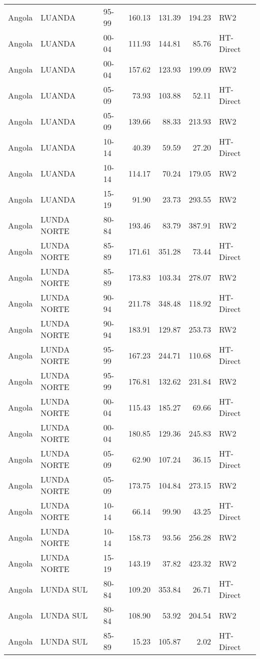 \begin{longtable}{lllrrrl}
  Angola & LUANDA & 95-99 & 160.13 & 131.39 & 194.23 & RW2 \\ 
  Angola & LUANDA & 00-04 & 111.93 & 144.81 & 85.76 & HT-Direct \\ 
  Angola & LUANDA & 00-04 & 157.62 & 123.93 & 199.09 & RW2 \\ 
  Angola & LUANDA & 05-09 & 73.93 & 103.88 & 52.11 & HT-Direct \\ 
  Angola & LUANDA & 05-09 & 139.66 & 88.33 & 213.93 & RW2 \\ 
  Angola & LUANDA & 10-14 & 40.39 & 59.59 & 27.20 & HT-Direct \\ 
  Angola & LUANDA & 10-14 & 114.17 & 70.24 & 179.05 & RW2 \\ 
  Angola & LUANDA & 15-19 & 91.90 & 23.73 & 293.55 & RW2 \\ 
  Angola & LUNDA NORTE & 80-84 & 193.46 & 83.79 & 387.91 & RW2 \\ 
  Angola & LUNDA NORTE & 85-89 & 171.61 & 351.28 & 73.44 & HT-Direct \\ 
  Angola & LUNDA NORTE & 85-89 & 173.83 & 103.34 & 278.07 & RW2 \\ 
  Angola & LUNDA NORTE & 90-94 & 211.78 & 348.48 & 118.92 & HT-Direct \\ 
  Angola & LUNDA NORTE & 90-94 & 183.91 & 129.87 & 253.73 & RW2 \\ 
  Angola & LUNDA NORTE & 95-99 & 167.23 & 244.71 & 110.68 & HT-Direct \\ 
  Angola & LUNDA NORTE & 95-99 & 176.81 & 132.62 & 231.84 & RW2 \\ 
  Angola & LUNDA NORTE & 00-04 & 115.43 & 185.27 & 69.66 & HT-Direct \\ 
  Angola & LUNDA NORTE & 00-04 & 180.85 & 129.36 & 245.83 & RW2 \\ 
  Angola & LUNDA NORTE & 05-09 & 62.90 & 107.24 & 36.15 & HT-Direct \\ 
  Angola & LUNDA NORTE & 05-09 & 173.75 & 104.84 & 273.15 & RW2 \\ 
  Angola & LUNDA NORTE & 10-14 & 66.14 & 99.90 & 43.25 & HT-Direct \\ 
  Angola & LUNDA NORTE & 10-14 & 158.73 & 93.56 & 256.28 & RW2 \\ 
  Angola & LUNDA NORTE & 15-19 & 143.19 & 37.82 & 423.32 & RW2 \\ 
  Angola & LUNDA SUL & 80-84 & 109.20 & 353.84 & 26.71 & HT-Direct \\ 
  Angola & LUNDA SUL & 80-84 & 108.90 & 53.92 & 204.54 & RW2 \\ 
  Angola & LUNDA SUL & 85-89 & 15.23 & 105.87 & 2.02 & HT-Direct \\ 

\end{longtable}
